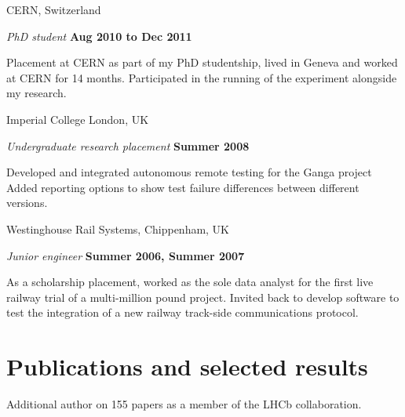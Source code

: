 \documentclass[10pt]{article}
\renewenvironment{compactitem}{
  \begin{list}{}{
    \setlength{\leftmargin}{1.5em}
  }
}{
  \end{list}
}
\begin{document}
CERN, Switzerland
\begin{compactitem}
\item \textit{PhD student}%
        \hfill \textbf{Aug 2010 to Dec 2011}
\begin{compactitem}
\item Placement at CERN as part of my PhD studentship, lived in Geneva and worked at CERN for 14 months.
Participated in the running of the \lhcb experiment alongside my research.
\end{compactitem}
\end{compactitem}

Imperial College London, UK
\begin{compactitem}
\item \textit{Undergraduate research placement}%
        \hfill \textbf{Summer 2008}
\begin{compactitem}
\item Developed and integrated autonomous remote testing for the Ganga project  
Added reporting options to show test failure differences between different versions.
\end{compactitem}
\end{compactitem}

Westinghouse Rail Systems, Chippenham, UK
\begin{compactitem}
\item \textit{Junior engineer}%
        \hfill \textbf{Summer 2006, Summer 2007}
\begin{compactitem}
\item As a scholarship placement, worked as the sole data analyst for the first live railway trial of a multi-million pound project. 
Invited back to develop software to test the integration of a new railway track-side communications protocol. 
\end{compactitem}
\end{compactitem}


\section*{Publications and selected results} 
\begin{compactitem}
\item {}
\item {}
\item {}
\item {}
\item {}
\item Additional author on 155 papers as a member of the LHCb collaboration.
\end{compactitem}	
\end{document}
